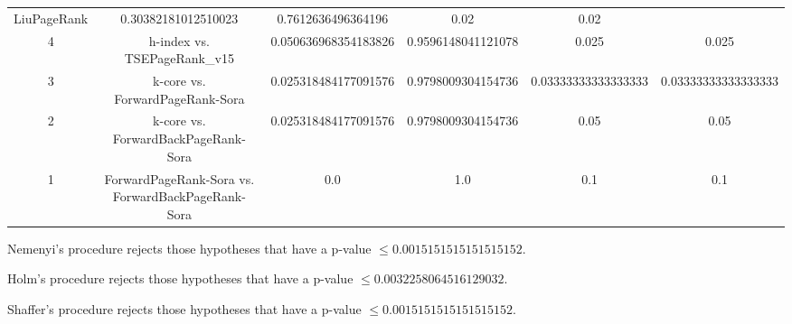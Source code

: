 \documentclass[a4paper,10pt]{article}
\begin{document}
\begin{landscape}
\begin{table}[!htp]
\begin{tabular}{cccccc}
LiuPageRank&0.30382181012510023&0.7612636496364196&0.02&0.02\\4&h-index vs. TSEPageRank_v15&0.050636968354183826&0.9596148041121078&0.025&0.025\\3&k-core vs. ForwardPageRank-Sora&0.025318484177091576&0.9798009304154736&0.03333333333333333&0.03333333333333333\\2&k-core vs. ForwardBackPageRank-Sora&0.025318484177091576&0.9798009304154736&0.05&0.05\\1&ForwardPageRank-Sora vs. ForwardBackPageRank-Sora&0.0&1.0&0.1&0.1\\\hline
\end{tabular}
\end{table}
Nemenyi's procedure rejects those hypotheses that have a p-value $\le0.0015151515151515152$.


Holm's procedure rejects those hypotheses that have a p-value $\le0.0032258064516129032$.


Shaffer's procedure rejects those hypotheses that have a p-value $\le0.0015151515151515152$.



\end{landscape}
\end{document}
